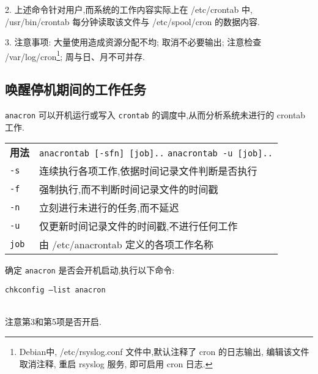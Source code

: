 \par
2. 上述命令针对用户,而系统的工作内容实际上在 /etc/crontab 中, /usr/bin/crontab 每分钟读取该文件与 /etc/spool/cron 的数据内容.

\par
3. 注意事项: 大量使用造成资源分配不均; 取消不必要输出; 注意检查 /var/log/cron\footnote[2]{Debian中, /etc/rsyslog.conf 文件中,默认注释了 cron 的日志输出, 编辑该文件取消注释, 重启 rsyslog 服务, 即可启用 cron 日志.}; 周与日、月不可并存.

\subsection{唤醒停机期间的工作任务}
\texttt{anacron} 可以开机运行或写入 \texttt{crontab} 的调度中,从而分析系统未进行的 crontab 工作.
\begin{longtable}{l@{ : }p{}}\hline\hline

    \textbf{用法} & \verb"anacrontab [-sfn] [job].." \newline
                    \verb"anacrontab -u [job].."\\

    \texttt{-s} & 连续执行各项工作,依据时间记录文件判断是否执行\\

    \texttt{-f} & 强制执行,而不判断时间记录文件的时间戳\\

    \texttt{-n} & 立刻进行未进行的任务,而不延迟 \\

    \texttt{-u} & 仅更新时间记录文件的时间戳,不进行任何工作\\

    \texttt{job} & 由 /etc/anacrontab 定义的各项工作名称\\

    \hline
\end{longtable}

\par
确定 \texttt{anacron} 是否会开机启动,执行以下命令:\\
\parbox{\textwidth}{\qquad\qquad \texttt{chkconfig --list anacron}} \\
注意第3和第5项是否开启.